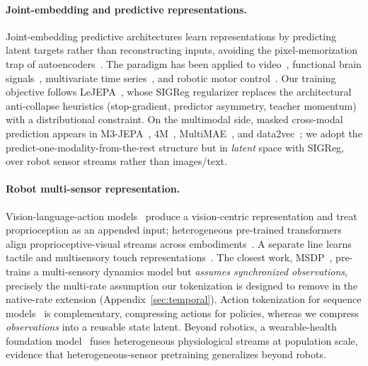\documentclass{article}
\begin{document}
\paragraph{Joint-embedding and predictive representations.}
Joint-embedding predictive architectures learn representations by predicting latent targets rather than reconstructing inputs, avoiding the pixel-memorization trap of autoencoders~\citep{ijepa2023,data2vec2022}. The paradigm has been applied to video~\citep{vjepa22025}, functional brain signals~\citep{jmaefmri2024}, multivariate time series~\citep{mtsjepa2026}, and robotic motor control~\citep{spatiotemporal2024}. Our training objective follows LeJEPA~\citep{lejepa2025}, whose SIGReg regularizer replaces the architectural anti-collapse heuristics (stop-gradient, predictor asymmetry, teacher momentum) with a distributional constraint. On the multimodal side, masked cross-modal prediction appears in M3-JEPA~\citep{m3jepa2024}, 4M~\citep{fourm2023}, MultiMAE~\citep{multimae2022}, and data2vec~\citep{data2vec2022}; we adopt the predict-one-modality-from-the-rest structure but in \emph{latent} space with SIGReg, over robot sensor streams rather than images/text.

\paragraph{Robot multi-sensor representation.}
Vision-language-action models~\citep{openvla2024} produce a vision-centric representation and treat proprioception as an appended input; heterogeneous pre-trained transformers align proprioceptive-visual streams across embodiments~\citep{hpt2024}. A separate line learns tactile and multisensory touch representations~\citep{sparsh2024,sparshx2025,seehearfeel2022,m3l2023}. The closest work, MSDP~\citep{msdp2025}, pre-trains a multi-sensory dynamics model but \emph{assumes synchronized observations}, precisely the multi-rate assumption our tokenization is designed to remove in the native-rate extension (Appendix~\ref{sec:temporal}). Action tokenization for sequence models~\citep{vqvla2025,fast2025,actioncodec2026,mojito2025} is complementary, compressing actions for policies, whereas we compress \emph{observations} into a reusable state latent. Beyond robotics, a wearable-health foundation model~\citep{sensorfm2026} fuses heterogeneous physiological streams at population scale, evidence that heterogeneous-sensor pretraining generalizes beyond robots.
\end{document}
